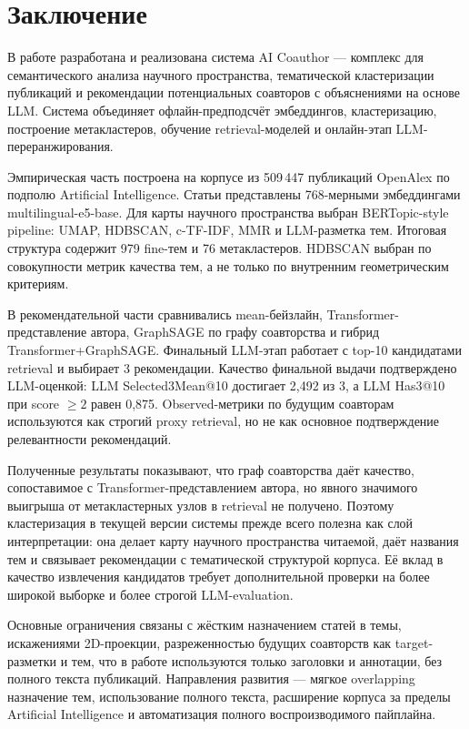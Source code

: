 \newpage
\section{Заключение}

В работе разработана и реализована система AI Coauthor — комплекс для семантического анализа
научного пространства, тематической кластеризации публикаций и рекомендации потенциальных
соавторов с объяснениями на основе LLM. Система объединяет офлайн-предподсчёт эмбеддингов,
кластеризацию, построение метакластеров, обучение retrieval-моделей и онлайн-этап
LLM-переранжирования.

Эмпирическая часть построена на корпусе из 509\,447 публикаций OpenAlex по подполю Artificial
Intelligence. Статьи представлены 768-мерными эмбеддингами multilingual-e5-base. Для карты
научного пространства выбран BERTopic-style pipeline: UMAP, HDBSCAN, c-TF-IDF, MMR и
LLM-разметка тем. Итоговая структура содержит 979 fine-тем и 76 метакластеров. HDBSCAN выбран по
совокупности метрик качества тем, а не только по внутренним геометрическим критериям.

В рекомендательной части сравнивались mean-бейзлайн, Transformer-представление автора, GraphSAGE
по графу соавторства и гибрид Transformer+GraphSAGE. Финальный LLM-этап работает с top-10
кандидатами retrieval и выбирает 3 рекомендации. Качество финальной выдачи подтверждено
LLM-оценкой: LLM Selected3Mean@10 достигает 2,492 из 3, а LLM Has3@10 при score $\geq 2$ равен
0,875. Observed-метрики по будущим соавторам используются как строгий proxy retrieval, но не как
основное подтверждение релевантности рекомендаций.

Полученные результаты показывают, что граф соавторства даёт качество, сопоставимое с
Transformer-представлением автора, но явного значимого выигрыша от метакластерных узлов в retrieval
не получено. Поэтому кластеризация в текущей версии системы прежде всего полезна как слой
интерпретации: она делает карту научного пространства читаемой, даёт названия тем и связывает
рекомендации с тематической структурой корпуса. Её вклад в качество извлечения кандидатов требует
дополнительной проверки на более широкой выборке и более строгой LLM-evaluation.

Основные ограничения связаны с жёстким назначением статей в темы, искажениями 2D-проекции,
разреженностью будущих соавторств как target-разметки и тем, что в работе используются только
заголовки и аннотации, без полного текста публикаций. Направления развития — мягкое overlapping
назначение тем, использование полного текста, расширение корпуса за пределы Artificial
Intelligence и автоматизация полного воспроизводимого пайплайна.
